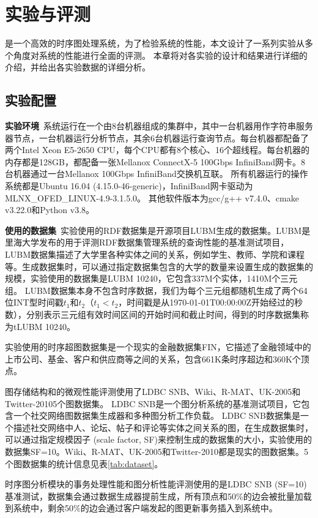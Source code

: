 \chapter{实验与评测}
\sys 是一个高效的时序图处理系统，为了检验系统的性能，本文设计了一系列实验从多个角度对系统的性能进行全面的评测。
本章将对各实验的设计和结果进行详细的介绍，并给出各实验数据的详细分析。

\section{实验配置}
\noindent\textbf{实验环境}\ 系统运行在一个由8台机器组成的集群中，其中一台机器用作字符串服务器节点，一台机器运行分析节点，其余6台机器运行查询节点。每台机器都配备了两个Intel Xeon E5-2650 CPU，每个CPU都有8个核心、16个超线程。每台机器的内存都是128GB，都配备一张Mellanox
ConnectX-5 100Gbps InfiniBand网卡。8台机器通过一台Mellanox 100Gbps InfiniBand交换机互联。
所有机器运行的操作系统都是Ubuntu 16.04 (4.15.0-46-generic)，InfiniBand网卡驱动为MLNX\_OFED\_LINUX-4.9-3.1.5.0。
其他软件版本为gcc/g++ v7.4.0、cmake v3.22.0和Python v3.8。

\noindent\textbf{使用的数据集}\ 实验使用的RDF数据集是开源项目LUBM\cite{lubm}生成的数据集。LUBM是里海大学发布的用于评测RDF数据集管理系统的查询性能的基准测试项目，LUBM数据集描述了大学里各种实体之间的关系，例如学生、教师、学院和课程等。生成数据集时，可以通过指定数据集包含的大学的数量来设置生成的数据集的规模，实验使用的数据集是LUBM 10240，它包含337M个实体，1410M个三元组。
LUBM数据集本身不包含时序数据，我们为每个三元组都随机生成了两个64位INT型时间戳$t_1$和$t_2$（$t_1<t_2$，时间戳是从1970-01-01T00:00:00Z开始经过的秒数），分别表示三元组有效时间区间的开始时间和截止时间，得到的时序数据集称为tLUBM 10240。

实验使用的时序超图数据集是一个现实的金融数据集FIN，它描述了金融领域中的上市公司、基金、客户和供应商等之间的关系，包含661K条时序超边和360K个顶点。

图存储结构\store 和\newstore 的微观性能评测使用了LDBC SNB\cite{snb}、Wiki\cite{wiki}、R-MAT\cite{rmat}、UK-2005\cite{uk}和Twitter-2010\cite{twitter}5个图数据集。
LDBC SNB是一个图分析系统的基准测试项目，它包含一个社交网络图数据集生成器和多种图分析工作负载。
LDBC SNB数据集是一个描述社交网络中人、论坛、帖子和评论等实体之间关系的图，在生成数据集时，可以通过指定规模因子 (scale factor, SF)来控制生成的数据集的大小，实验使用的数据集SF=10。Wiki、R-MAT、UK-2005和Twitter-2010都是现实的图数据集。5个图数据集的统计信息见表\ref{tab:dataset}。

时序图分析模块的事务处理性能和图分析性能评测使用的是LDBC SNB (SF=10)基准测试，数据集会通过数据生成器提前生成，所有顶点和50\%的边会被批量加载到系统中，剩余50\%的边会通过客户端发起的图更新事务插入到系统中。

